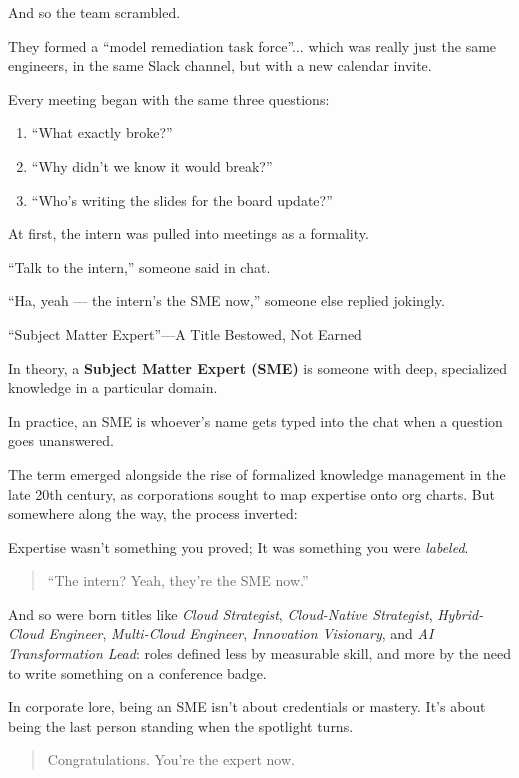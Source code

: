     \medskip
    
    And so the team scrambled.
    
    They formed a ``model remediation task force''... which was really just the same engineers, in the same Slack channel, but with a new calendar invite.
    
    Every meeting began with the same three questions:
    
    \begin{enumerate}
        \item “What exactly broke?”
        \item “Why didn’t we know it would break?”
        \item “Who’s writing the slides for the board update?”
    \end{enumerate}
    
    At first, the intern was pulled into meetings as a formality.
    
    “Talk to the intern,” someone said in chat.
    
    “Ha, yeah — the intern’s the SME now,” someone else replied jokingly.

    \medskip

\begin{HistoricalSidebar}{“Subject Matter Expert”—A Title Bestowed, Not Earned}

In theory, a \textbf{Subject Matter Expert (SME)} is someone with deep, specialized knowledge in a particular domain.  

\medskip

In practice, an SME is whoever’s name gets typed into the chat when a question goes unanswered.

\medskip

The term emerged alongside the rise of formalized knowledge management in the late 20th century, as corporations sought to map expertise onto org charts. But somewhere along the way, the process inverted:  

\medskip

Expertise wasn’t something you proved; It was something you were \textit{labeled}.

\begin{quote}
“The intern? Yeah, they’re the SME now.”
\end{quote}

And so were born titles like \textit{Cloud Strategist}, \textit{Cloud-Native Strategist}, \textit{Hybrid-Cloud Engineer}, \textit{Multi-Cloud Engineer}, \textit{Innovation Visionary}, and \textit{AI Transformation Lead}: roles defined less by measurable skill, and more by the need to write something on a conference badge.

\medskip

In corporate lore, being an SME isn’t about credentials or mastery.  It’s about being the last person standing when the spotlight turns.  

\begin{quote}
Congratulations. You’re the expert now.
\end{quote}

\end{HistoricalSidebar}

